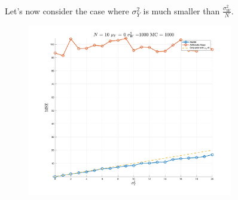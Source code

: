 Let's now consider the case where $\sigma_Y^2$ is much smaller than $\frac {\sigma^2_W}N$.

\begin{figure}[H]
    \centering
    \includegraphics[width=0.8\textwidth]{./figures/appendix_a/figure_9.png}
\end{figure}

